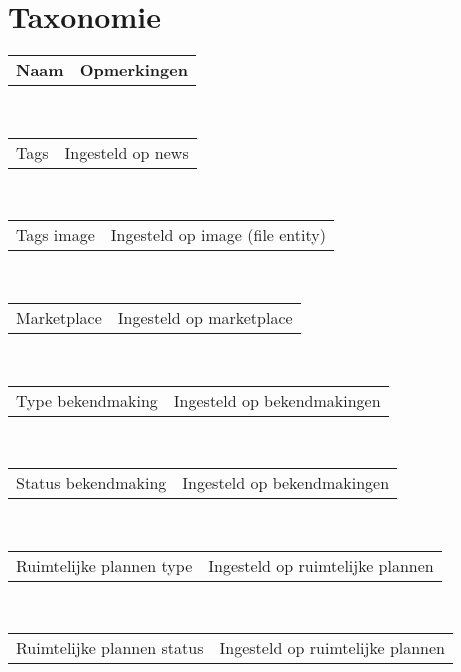 \section{Taxonomie}\label{taxonomie}

\newcommand{\taxonomie}[2]{
  \begin{tabular}{ p{4cm} p{7cm} }
  #1 & #2
  \end{tabular}
  \\
}

\taxonomie{\textbf{Naam}}{\textbf{Opmerkingen}} 

\taxonomie{Tags}{Ingesteld op news}
\taxonomie{Tags image}{Ingesteld op image (file entity)}
\taxonomie{Marketplace}{Ingesteld op marketplace}
\taxonomie{Type bekendmaking}{Ingesteld op bekendmakingen}
\taxonomie{Status bekendmaking}{Ingesteld op bekendmakingen}
\taxonomie{Ruimtelijke plannen type}{Ingesteld op ruimtelijke plannen}
\taxonomie{Ruimtelijke plannen status}{Ingesteld op ruimtelijke plannen}